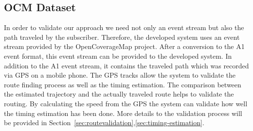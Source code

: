 \documentclass[master,english]{hgbthesis}
\begin{document}
\subsection{OCM Dataset}
In order to validate our approach we need not only an event stream but also the path traveled by the subscriber. Therefore, the developed system uses an event stream provided by the OpenCoverageMap project. After a conversion to the A1 event format, this event stream can be provided to the developed system. In addition to the A1 event stream, it contains the traveled path which was recorded via GPS on a mobile phone. The GPS tracks allow the system to validate the route finding process as well as the timing estimation. The comparison between the estimated trajectory and the actually traveled route helps to validate the routing. By calculating the speed from the GPS the system can validate how well the timing estimation has been done. More details to the validation process will be provided in Section~\ref{sec:routevalidation},\ref{sec:timing-estimation}.
\end{document}

